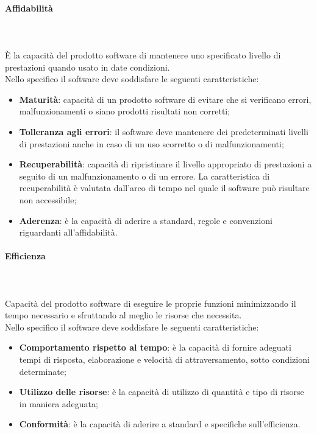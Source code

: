 \paragraph{Affidabilità}\mbox{} \\ \mbox{} \\
È la capacità del prodotto software di mantenere uno specificato livello di prestazioni quando usato in date condizioni. \\
Nello specifico il software deve soddisfare le seguenti caratteristiche:
\begin{itemize}
	\item \textbf{Maturità}: capacità di un prodotto software di evitare che si verificano errori, malfunzionamenti o siano prodotti risultati non corretti;
	\item \textbf{Tolleranza agli errori}: il software deve mantenere dei predeterminati livelli di prestazioni anche in caso di un uso scorretto o di malfunzionamenti;
	\item \textbf{Recuperabilità}: capacità di ripristinare il livello appropriato di prestazioni a seguito di un malfunzionamento o di un errore. La caratteristica di recuperabilità è valutata dall'arco di tempo nel quale il software può risultare non accessibile;
	\item \textbf{Aderenza}: è la capacità di aderire a standard, regole e convenzioni riguardanti all'affidabilità.
\end{itemize}
\paragraph{Efficienza}\mbox{} \\ \mbox{} \\
Capacità del prodotto software di eseguire le proprie funzioni minimizzando il tempo necessario e sfruttando al meglio le risorse che necessita. \\
Nello specifico il software deve soddisfare le seguenti caratteristiche:
\begin{itemize}
	\item \textbf{Comportamento rispetto al tempo}: è la capacità di fornire adeguati tempi di risposta, elaborazione e velocità di attraversamento, sotto condizioni determinate;
	\item \textbf{Utilizzo delle risorse}: è la capacità di utilizzo di quantità e tipo di risorse in maniera adeguata;
	\item \textbf{Conformità}: è la capacità di aderire a standard e specifiche sull'efficienza\glo.
\end{itemize}
